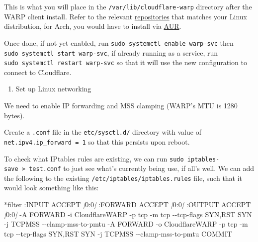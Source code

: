 \documentclass[
]{article}
\newenvironment{Shaded}{\begin{snugshade}}{\end{snugshade}}
\newcommand{\AttributeTok}[1]{\textcolor[rgb]{0.13,0.29,0.53}{#1}}
\newcommand{\ExtensionTok}[1]{#1}
\newcommand{\NormalTok}[1]{#1}
\newcommand{\PreprocessorTok}[1]{\textcolor[rgb]{0.56,0.35,0.01}{\textit{#1}}}
\newcommand{\SpecialStringTok}[1]{\textcolor[rgb]{0.31,0.60,0.02}{#1}}
\providecommand{\tightlist}{%
  \setlength{\itemsep}{0pt}\setlength{\parskip}{0pt}}\usepackage{longtable,booktabs,array}
\begin{document}
This is what you will place in the \texttt{/var/lib/cloudflare-warp}
directory after the WARP client install. Refer to the relevant
\href{https://pkg.cloudflareclient.com/}{repositories} that matches your
Linux distribution, for Arch, you would have to install via
\href{https://aur.archlinux.org/packages/cloudflare-warp-bin}{AUR}.

Once done, if not yet enabled, run
\texttt{sudo\ systemctl\ enable\ warp-svc} then
\texttt{sudo\ systemctl\ start\ warp-svc}, if already running as a
service, run \texttt{sudo\ systemctl\ restart\ warp-svc} so that it will
use the new configuration to connect to Cloudflare.

\newpage{}

\begin{enumerate}
\def\labelenumi{\arabic{enumi}.}
\setcounter{enumi}{4}
\tightlist
\item
  Set up Linux networking
\end{enumerate}

We need to enable IP forwarding and MSS clamping (WARP's MTU is 1280
bytes).

Create a \texttt{.conf} file in the \texttt{etc/sysctl.d/} directory
with value of \texttt{net.ipv4.ip\_forward\ =\ 1} so that this persists
upon reboot.

To check what IPtables rules are existing, we can run
\texttt{sudo\ iptables-save\ \textgreater{}\ test.conf} to just see
what's currently being use, if all's well. We can add the following to
the existing \texttt{/etc/iptables/iptables.rules} file, such that it
would look something like this:

\begin{Shaded}
\begin{Highlighting}[numbers=left,,]
\ExtensionTok{*filter}
\ExtensionTok{:INPUT}\NormalTok{ ACCEPT }\PreprocessorTok{[}\SpecialStringTok{0:0}\PreprocessorTok{]}
\ExtensionTok{:FORWARD}\NormalTok{ ACCEPT }\PreprocessorTok{[}\SpecialStringTok{0:0}\PreprocessorTok{]}
\ExtensionTok{:OUTPUT}\NormalTok{ ACCEPT }\PreprocessorTok{[}\SpecialStringTok{0:0}\PreprocessorTok{]}
\ExtensionTok{{-}A}\NormalTok{ FORWARD }\AttributeTok{{-}i}\NormalTok{ CloudflareWARP }\AttributeTok{{-}p}\NormalTok{ tcp }\AttributeTok{{-}m}\NormalTok{ tcp }\AttributeTok{{-}{-}tcp{-}flags}\NormalTok{ SYN,RST SYN }\AttributeTok{{-}j}\NormalTok{ TCPMSS }\AttributeTok{{-}{-}clamp{-}mss{-}to{-}pmtu}
\ExtensionTok{{-}A}\NormalTok{ FORWARD }\AttributeTok{{-}o}\NormalTok{ CloudflareWARP }\AttributeTok{{-}p}\NormalTok{ tcp }\AttributeTok{{-}m}\NormalTok{ tcp }\AttributeTok{{-}{-}tcp{-}flags}\NormalTok{ SYN,RST SYN }\AttributeTok{{-}j}\NormalTok{ TCPMSS }\AttributeTok{{-}{-}clamp{-}mss{-}to{-}pmtu}
\ExtensionTok{COMMIT}
\end{Highlighting}
\end{Shaded}
\end{document}
